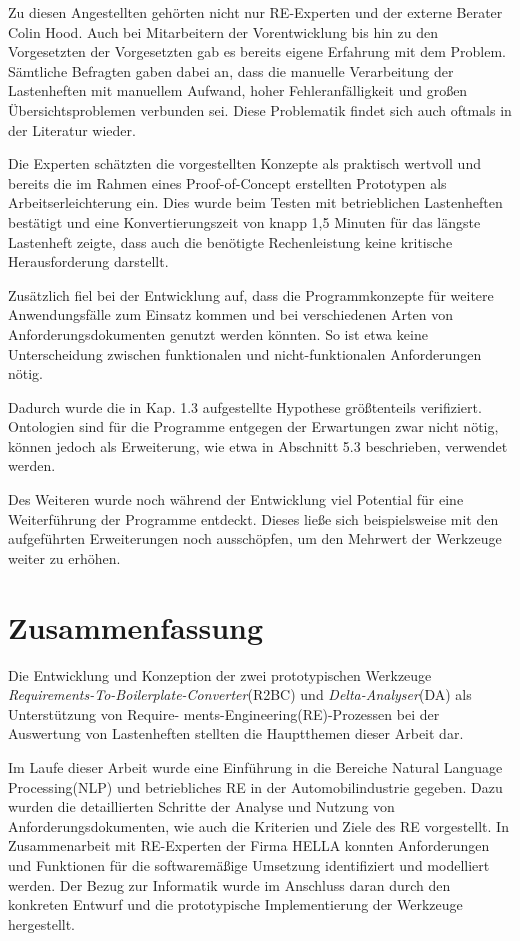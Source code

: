 \documentclass[12pt]{report}
\begin{document}
Zu diesen Angestellten gehörten nicht nur RE-Experten und der externe Berater Colin Hood. Auch bei Mitarbeitern der Vorentwicklung bis hin zu den Vorgesetzten der Vorgesetzten gab es bereits eigene Erfahrung mit dem Problem. Sämtliche Befragten gaben dabei an, dass die manuelle Verarbeitung der Lastenheften mit manuellem Aufwand, hoher Fehleranfälligkeit und großen Übersichtsproblemen verbunden sei. Diese Problematik findet sich auch oftmals in der Literatur wieder\cite{he13}\cite{mw02}.

Die Experten schätzten die vorgestellten Konzepte als praktisch wertvoll und bereits die im Rahmen eines Proof-of-Concept erstellten Prototypen als Arbeitserleichterung ein. Dies wurde beim Testen mit betrieblichen Lastenheften bestätigt und eine Konvertierungszeit von knapp 1,5 Minuten für das längste Lastenheft zeigte, dass auch die benötigte Rechenleistung keine kritische Herausforderung darstellt. 

Zusätzlich fiel bei der Entwicklung auf, dass die Programmkonzepte für  weitere Anwendungsfälle zum Einsatz kommen und bei verschiedenen Arten von Anforderungsdokumenten genutzt werden könnten. So ist etwa keine Unterscheidung zwischen funktionalen und nicht-funktionalen Anforderungen nötig. 

Dadurch wurde die in Kap. 1.3 aufgestellte Hypothese größtenteils verifiziert. Ontologien sind für die Programme entgegen der Erwartungen zwar nicht nötig, können jedoch als Erweiterung, wie etwa in Abschnitt 5.3 beschrieben, verwendet werden. 

Des Weiteren wurde noch während der Entwicklung viel Potential für eine Weiterführung der Programme entdeckt. Dieses ließe sich beispielsweise mit den aufgeführten Erweiterungen noch ausschöpfen, um den Mehrwert der Werkzeuge weiter zu erhöhen. 

\section{Zusammenfassung}
Die Entwicklung und Konzeption der zwei prototypischen Werkzeuge \textit{Requirements-To-Boilerplate-Converter}(R2BC) und \textit{Delta-Analyser}(DA) als Unterstützung von Require- ments-Engineering(RE)-Prozessen bei der Auswertung von Lastenheften stellten die Hauptthemen dieser Arbeit dar.

Im Laufe dieser Arbeit wurde eine Einführung in die Bereiche Natural Language Processing(NLP) und betriebliches RE in der Automobilindustrie gegeben. Dazu wurden die detaillierten Schritte der Analyse und Nutzung von Anforderungsdokumenten, wie auch die Kriterien und Ziele des RE vorgestellt. In Zusammenarbeit mit RE-Experten der Firma HELLA konnten Anforderungen und Funktionen für die softwaremäßige Umsetzung identifiziert und modelliert werden. Der Bezug zur Informatik wurde im Anschluss daran durch den konkreten Entwurf und die prototypische Implementierung der Werkzeuge hergestellt. 
\end{document}
